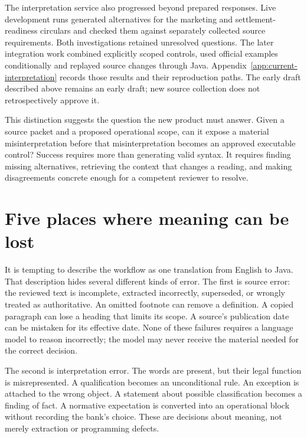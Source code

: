 \documentclass[12pt,a4paper,oneside,openany]{book}
\begin{document}
The interpretation service also progressed beyond prepared responses. Live
development runs generated alternatives for the marketing and settlement-readiness
circulars and checked them against separately collected source requirements.
Both investigations retained unresolved questions. The later integration work
combined explicitly scoped controls, used official examples conditionally and
replayed source changes through Java. Appendix~\ref{app:current-interpretation}
records those results and their reproduction paths. The early draft described
above remains an early draft; new source collection does not retrospectively
approve it.

This distinction suggests the question the new product must answer. Given a
source packet and a proposed operational scope, can it expose a material
misinterpretation before that misinterpretation becomes an approved executable
control? Success requires more than generating valid syntax. It requires finding
missing alternatives, retrieving the context that changes a reading, and making
disagreements concrete enough for a competent reviewer to resolve.

\section{Five places where meaning can be lost}
\label{merge:M01:02}

\label{sec:problem-boundaries}
It is tempting to describe the workflow as one translation from English to
Java. That description hides several different kinds of error. The first is
source error: the reviewed text is incomplete, extracted incorrectly, superseded,
or wrongly treated as authoritative. An omitted footnote can remove a definition.
A copied paragraph can lose a heading that limits its scope. A source's
publication date can be mistaken for its effective date. None of these failures
requires a language model to reason incorrectly; the model may never receive
the material needed for the correct decision.

The second is interpretation error. The words are present, but their legal
function is misrepresented. A qualification becomes an unconditional rule. An
exception is attached to the wrong object. A statement about possible
classification becomes a finding of fact. A normative expectation is converted
into an operational block without recording the bank's choice. These are
decisions about meaning, not merely extraction or programming defects.
\end{document}
